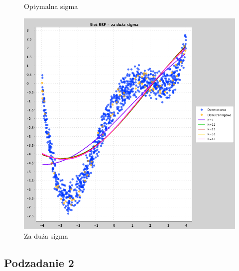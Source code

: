 \documentclass[a4paper, portrait,11pt]{article}
\begin{document}
\begin{figure}[!htb]
\begin{minipage}{0.33\textwidth}
    \caption{Optymalna sigma}
  \end{minipage}
  \begin{minipage}{0.33\textwidth}
    \centering
    \includegraphics[width=1\linewidth]{../data/approximation3/1/big.png}
    \caption{Za duża sigma}
  \end{minipage}\hfill
\end{figure}

\subsection{Podzadanie 2}
\end{document}

